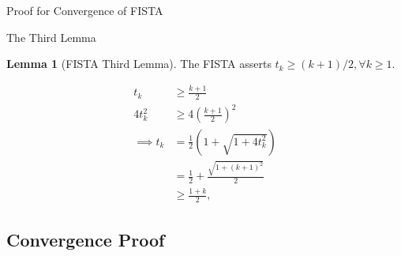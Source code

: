 \documentclass[]{article}
\theoremstyle{definition}
\newtheorem{lemma}{Lemma}[subsection]  %
\begin{document}
\begin{section}{Proof for Convergence of FISTA}
    \begin{subsection}{The Third Lemma}
        \begin{lemma}[FISTA Third Lemma]
            The FISTA asserts $t_k \ge (k + 1)/2, \forall k \ge 1$. 
        \end{lemma}
        \begin{align*}
            t_k 
            &\ge \frac{k + 1}{2}
            \\
            4t_k^2 
            &\ge 4\left(
                \frac{k + 1}{2}
            \right)^2
            \\
            \implies 
            t_k &= \frac{1}{2}\left(
                1 + \sqrt{1 + 4t_k^2}
            \right)
            \\
            &= 
            \frac{1}{2} + \frac{\sqrt{1 + (k + 1)^2}}{2}
            \\
            & \ge \frac{1 + k}{2}, 
        \end{align*}
    \end{subsection}
    \subsection{Convergence Proof}
        
\end{section}\label{sec:fista1_proof}



\end{document}
